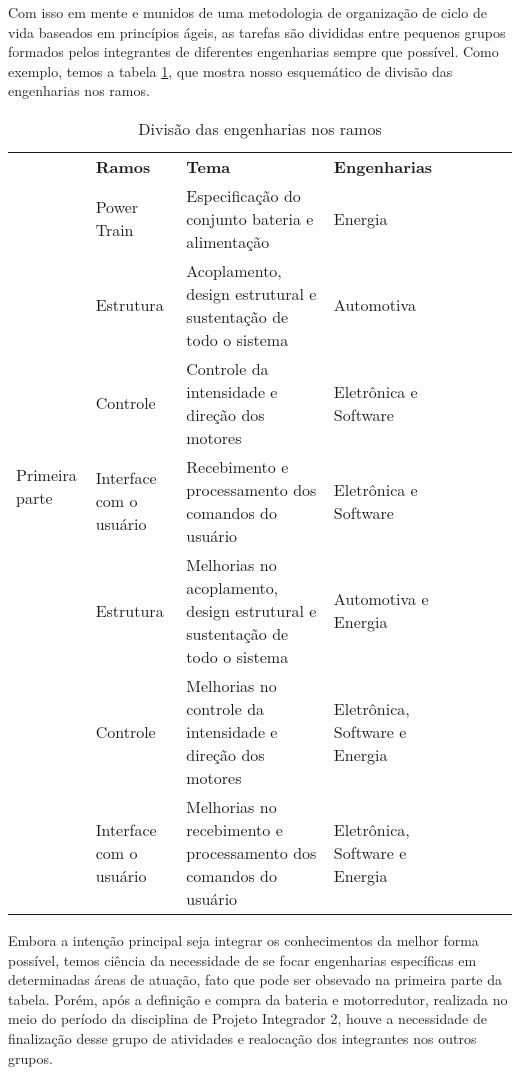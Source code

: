 Com isso em mente e munidos de uma metodologia de organização de ciclo de vida baseados em princípios ágeis, as tarefas são divididas entre pequenos grupos formados pelos integrantes de diferentes engenharias sempre que possível. Como exemplo, temos a tabela \ref{tab:divisao_ramos}, que mostra nosso esquemático de divisão das engenharias nos ramos.

\begin{table}[]
	\centering
	\caption{Divisão das engenharias nos ramos}
	\label{tab:divisao_ramos}
	\begin{tabular}{lp{}|lp{}|lp{}|lp{}}
		\cline{2-4}	& \textbf{Ramos}  & \textbf{Tema} & \textbf{Engenharias} & \\ \cline{1-4}

		\multicolumn{1}{|l|}{\multirow{6}{*}{{Primeira parte}}} & Power Train & Especificação do conjunto bateria e alimentação & Energia & \\ \cline{2-4}
		\multicolumn{1}{|l|}{} & Estrutura & Acoplamento, design estrutural e sustentação de todo o sistema & Automotiva & \\ \cline{2-4}
		\multicolumn{1}{|l|}{} & Controle & Controle da intensidade e direção dos motores & Eletrônica e Software & \\ \cline{2-4}
		\multicolumn{1}{|l|}{} & Interface com o usuário & Recebimento e processamento dos comandos do usuário & Eletrônica e Software & \\	\cline{1-4}

		\multicolumn{1}{|l|}{\multirow{3}{*}{{Segunda parte}}} & Estrutura               & Melhorias no acoplamento, design estrutural e sustentação de todo o sistema & Automotiva e Energia & \\ \cline{2-4}
		\multicolumn{1}{|l|}{} & Controle & Melhorias no controle da intensidade e direção dos motores & Eletrônica, Software e Energia & \\ \cline{2-4}
		\multicolumn{1}{|l|}{} & Interface com o usuário & Melhorias no recebimento e processamento dos comandos do usuário & Eletrônica, Software e Energia & \\ \cline{1-4}
	\end{tabular}
\end{table}

Embora a intenção principal seja integrar os conhecimentos da melhor forma possível, temos ciência da necessidade de se focar engenharias específicas em determinadas áreas de atuação, fato que pode ser obsevado na primeira parte da tabela. Porém, após a definição e compra da bateria e motorredutor, realizada no meio do período da disciplina de Projeto Integrador 2, houve a necessidade de finalização desse grupo de atividades e realocação dos integrantes nos outros grupos.

